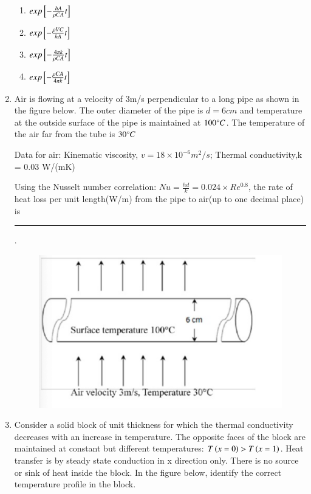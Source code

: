 \documentclass[journal,12pt,onecolumn]{IEEEtran}
\theoremstyle{remark}
\begin{document}
\begin{enumerate}
    \hfill{}
\begin{multicols}{2}
\begin{enumerate}
    \item $exp{}\left[-\frac{hA}{\rho CA}t\right]$
    \item $exp{}\left[-\frac{\rho V C}{hA}t\right]$
    \item $exp{}\left[-\frac{4\pi k}{\rho CA}t\right]$
    \item $exp{}\left[-\frac{\rho C A}{4\pi k}t\right]$
\end{enumerate}
\end{multicols}

    \item Air is flowing at a velocity of 3m/s perpendicular to a long pipe as shown in the figure below. The outer diameter of the pipe is $d = 6cm$ and temperature at the outside surface of the pipe is maintained at $100\degree C$. The temperature of the air far from the tube is $30\degree C$ 

    Data for air: Kinematic viscosity, $v = 18\times 10^{-6} m^2/s$; Thermal conductivity,k = 0.03 W/(mK)

    Using the Nusselt number correlation: $Nu = \frac{hd}{k} = 0.024 \times Re^{0.8}$, the rate of heat loss per unit length(W/m) from the pipe to air(up to one decimal place) is \rule{40pt}{0.1mm}.

\hfill{}
\begin{figure}[H]
    \centering
    \includegraphics[width=0.5\columnwidth]{figs/50.png}
    \caption{}
    \label{fig:50}
\end{figure}

    \item Consider a solid block of unit thickness for which the thermal conductivity decreases with an increase in temperature. The opposite faces of the block are maintained at constant but different temperatures: $T\left(x=0\right)>T\left(x=1\right)$. Heat transfer is by steady state conduction in x direction only. There is no source or sink of heat inside the block. In the figure below, identify the correct temperature profile in the block.


\end{enumerate}
\end{document}
